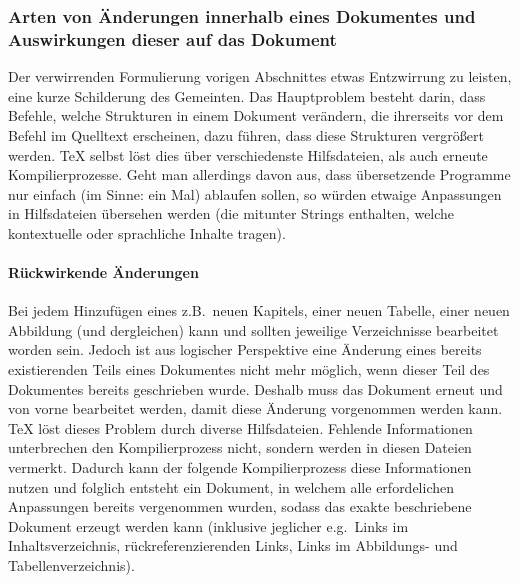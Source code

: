 \subsubsection*{Arten von Änderungen innerhalb eines Dokumentes und Auswirkungen dieser auf das Dokument}%
Der verwirrenden Formulierung vorigen Abschnittes etwas Entzwirrung zu leisten, eine kurze Schilderung des Gemeinten. Das Hauptproblem besteht darin, dass Befehle, welche Strukturen in einem Dokument verändern, die ihrerseits vor dem Befehl im Quelltext erscheinen, dazu führen, dass diese Strukturen vergrößert werden. \TeX{} selbst löst dies über verschiedenste Hilfsdateien, als auch erneute Kompilierprozesse. Geht man allerdings davon aus, dass übersetzende Programme nur einfach (im Sinne: ein Mal) ablaufen sollen, so würden etwaige Anpassungen in Hilfsdateien übersehen werden (die mitunter Strings enthalten, welche kontextuelle oder sprachliche Inhalte tragen). 

\paragraph*{Rückwirkende Änderungen}
Bei jedem Hinzufügen eines z.B.\ neuen Kapitels, einer neuen Tabelle, einer neuen Abbildung (und dergleichen) kann und sollten jeweilige Verzeichnisse bearbeitet worden sein. Jedoch ist aus logischer Perspektive eine Änderung eines bereits existierenden Teils eines Dokumentes nicht mehr möglich, wenn dieser Teil des Dokumentes bereits geschrieben wurde. Deshalb muss das Dokument erneut und von vorne bearbeitet werden, damit diese Änderung vorgenommen werden kann. %
\TeX{} löst dieses Problem durch diverse Hilfsdateien. Fehlende Informationen unterbrechen den Kompilierprozess nicht, sondern werden in diesen Dateien vermerkt. Dadurch kann der folgende Kompilierprozess diese Informationen nutzen und folglich entsteht ein Dokument, in welchem alle erfordelichen Anpassungen bereits vergenommen wurden, sodass das exakte beschriebene Dokument erzeugt werden kann (inklusive jeglicher e.g.\ Links im Inhaltsverzeichnis, rückreferenzierenden Links, Links im Abbildungs- und Tabellenverzeichnis).

